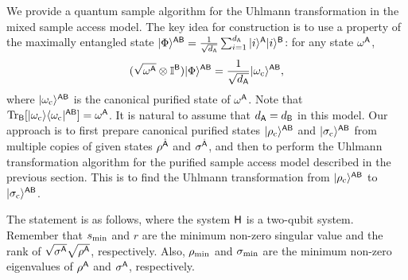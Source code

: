 



We provide a quantum sample algorithm for the Uhlmann transformation in the mixed sample access model.
The key idea for construction is to use a property of the maximally entangled state $|\Phi\rangle^{{\mathsf{A}}{\mathsf{B}}} = \frac{1}{\sqrt{d_{\mathsf{A}}}}\sum_{i=1}^{d_{\mathsf{A}}}|i\rangle^{\mathsf{A}}|i\rangle^{{\mathsf{B}}}$: for any state $\omega^{\mathsf{A}}$,
\begin{equation}
(\sqrt{\omega^{\mathsf{A}}} \otimes \mathbb{I}^{{\mathsf{B}}})|\Phi\rangle^{{\mathsf{A}}{\mathsf{B}}}
= \frac{1}{\sqrt{d_{\mathsf{A}}}}|\omega_{\rm c}\rangle^{{\mathsf{A}}{\mathsf{B}}},
\end{equation}
where $|\omega_{\rm c}\rangle^{{\mathsf{A}}{\mathsf{B}}}$ is the canonical purified state of $\omega^{\mathsf{A}}$. 
Note that $\operatorname{Tr}_{\mathsf{B}}[|\omega_{\rm c}\rangle\langle\omega_{\rm c}|^{{\mathsf{A}}{\mathsf{B}}}] = \omega^{\mathsf{A}}$.
It is natural to assume that $d_{\mathsf{A}} = d_{\mathsf{B}}$ in this model.
Our approach is to first prepare canonical purified states $|\rho_{\rm c}\rangle^{{\mathsf{A}}{\mathsf{B}}}$ and $|\sigma_{\rm c}\rangle^{{\mathsf{A}}{\mathsf{B}}}$ from multiple copies of given states $\rho^{\hat{{\mathsf{A}}}}$ and $\sigma^{\hat{{\mathsf{A}}}}$, and then to perform the Uhlmann transformation algorithm for the purified sample access model described in the previous section.  
This is to find the Uhlmann transformation from $|\rho_{\rm c}\rangle^{{\mathsf{A}}{\mathsf{B}}}$ to $|\sigma_{\rm c}\rangle^{{\mathsf{A}}{\mathsf{B}}}$.


The statement is as follows, where the system ${\mathsf{H}}$ is a two-qubit system. 
Remember that $s_{\rm min}$ and $r$ are the minimum non-zero singular value and the rank of $\sqrt{\sigma^{\mathsf{A}}}\sqrt{\rho^{\mathsf{A}}}$, respectively. Also, $\rho_{\rm min}$ and $\sigma_{\rm min}$ are the minimum non-zero eigenvalues of $\rho^{\mathsf{A}}$ and $\sigma^{\mathsf{A}}$, respectively.





